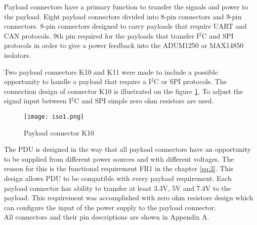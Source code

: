 Payload connectors have a primary function to transfer the signals and power to the payload. Eight payload connectors divided into 8-pin connectors and 9-pin connectors. 8-pin connectors designed to carry payloads that require UART and CAN protocols. 9th pin required for the payloads that transfer I$^2$C and SPI protocols in order to give a power feedback into the ADUM1250 or MAX14850 isolators.  

Two payload connectors K10 and K11 were made to include a possible opportunity to handle a payload that require a I$^2$C or SPI protocols.
The connection design of connector K10 is illustrated on the figure \ref{fig: iso1}. To adjust the signal input between I$^2$C and SPI simple zero ohm resistors are used.

\begin{figure}[h]
	\centering
	\texttt{[image: iso1.png]}
	\caption{Payload connector K10}
	\label{fig: iso1}
\end{figure} 
 
The PDU is designed in the way that all payload connectors have an opportunity to be supplied from different power sources and with different voltages. The reason for this is the functional requirement FR1 in the chapter \ref{eq:3}. This design allows PDU to be compatible with every payload requirement. Each payload connector has ability to transfer at least 3.3V, 5V and 7.4V to the payload.  This requirement was accomplished with zero ohm  resistors  design which can configure the input of the power supply to the payload connector.\\

All connectors and their pin descriptions are shown in Appendix A. 

 
  
  